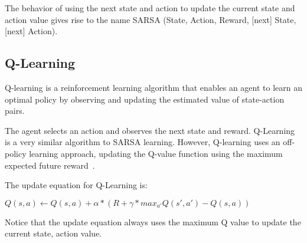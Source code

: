 The behavior of using the next state and action to update the current state and action value gives rise to the name SARSA (State, Action, Reward, [next] State, [next] Action).

\subsection{Q-Learning}
Q-learning is a reinforcement learning algorithm that enables an agent to learn an optimal policy by observing and updating the estimated value of state-action pairs.

The agent selects an action and observes the next state and reward.
Q-Learning is a very similar algorithm to SARSA learning. However, Q-learning uses an off-policy learning approach, updating the Q-value function using the maximum expected future reward~\citep{sutton2018reinforcement}.

The update equation for Q-Learning is:

$Q(s,a) \leftarrow Q(s,a) + \alpha*(R + \gamma*max_{a'}Q(s',a') - Q(s,a))$

Notice that the update equation always uses the maximum Q value to update the current state, action value.